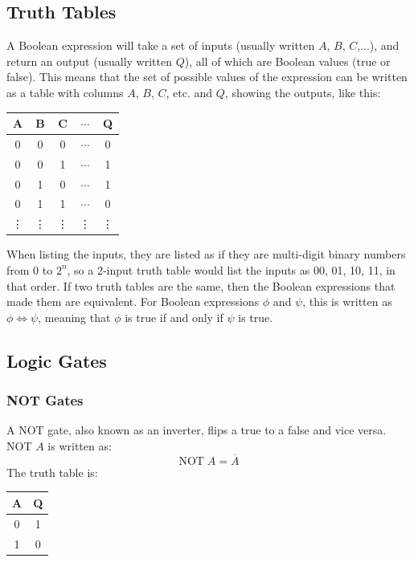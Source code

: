         \subsection{Truth Tables}
            A Boolean expression will take a set of inputs (usually written $A$, $B$, $C$,...), and return an output (usually written $Q$), all of which are Boolean values (true or false).
            This means that the set of possible values of the expression can be written as a table with columns $A$, $B$, $C$, etc. and $Q$, showing the outputs, like this:
            \begin{center}
                \begin{tabular}{c c c c|c}
                    \textbf{A} & \textbf{B} & \textbf{C} & $\cdots$ & \textbf{Q} \\
                    \hline
                    0 & 0 & 0 & $\cdots$ & 0 \\
                    0 & 0 & 1 & $\cdots$ & 1 \\
                    0 & 1 & 0 & $\cdots$ & 1 \\
                    0 & 1 & 1 & $\cdots$ & 0 \\
                    \vdots & \vdots & \vdots & \vdots & \vdots
                \end{tabular}
            \end{center}
            When listing the inputs, they are listed as if they are multi-digit binary numbers from 0 to $2^n$, so a 2-input truth table would list the inputs as 00, 01, 10, 11, in that order.
            If two truth tables are the same, then the Boolean expressions that made them are equivalent.
            For Boolean expressions $\phi$ and $\psi$, this is written as $\phi\iff\psi$, meaning that $\phi$ is true if and only if $\psi$ is true.

        \subsection{Logic Gates}
            \subsubsection{NOT Gates}
                A NOT gate, also known as an inverter, flips a true to a false and vice versa.
                NOT $A$ is written as:
                \begin{equation}
                    \text{NOT}\;A=\overline{A}
                \end{equation}
                The truth table is:
                \begin{center}
                    \begin{tabular}{c|c}
                        \textbf{A} & \textbf{Q} \\
                        \hline
                        0 & 1 \\
                        1 & 0
                    \end{tabular}
                \end{center}
